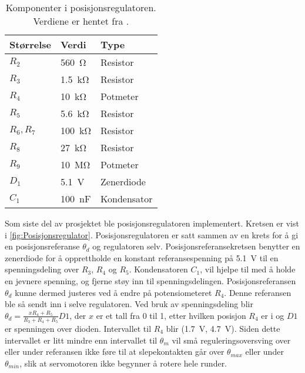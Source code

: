 \begin{table}[h]
    \centering
    \caption{Komponenter i posisjonsregulatoren. Verdiene er hentet fra \cite{AnalogMotorlabbOppgaver}.}
    \begin{tabular}{lll}
        \toprule
		Størrelse & Verdi & Type \\
		\midrule
        $R_2$ & \SI{560}{\ohm} & Resistor \\
        $R_3$ & \SI{1.5}{\kilo\ohm} & Resistor\\
        $R_4$ & \SI{10}{\kilo\ohm} & Potmeter\\
        $R_5$ & \SI{5.6}{\kilo\ohm} & Resistor\\
        $R_6, R_7$ & \SI{100}{\kilo\ohm} & Resistor\\
        $R_8$ & \SI{27}{\kilo\ohm} & Resistor\\
        $R_9$ & \SI{10}{\mega\ohm} & Potmeter\\
        $D_1$ & \SI{5.1}{\volt} & Zenerdiode\\
        $C_1$ & \SI{100}{\nano\farad} & Kondensator\\
		\bottomrule
    \end{tabular}
    \label{tab:my_label}
\end{table}

Som siste del av prosjektet ble posisjonsregulatoren implementert. Kretsen er vist i \autoref{fig:Posisjonsregulator}. Posisjonsregulatoren er satt sammen av en krets for å gi en posisjonsreferanse $\theta_d$ og regulatoren selv.
Posisjonsreferansekretsen benytter en zenerdiode for å opprettholde en konstant referansespenning på {\SI{5.1}{\volt}} til en spenningsdeling over $R_3$, $R_4$ og $R_5$. Kondensatoren $C_1$, vil hjelpe til med å holde en jevnere spenning, og fjerne støy inn til spenningsdelingen. Posisjonsreferansen $\theta_d$ kunne dermed justeres ved å endre på potensiometeret $R_4$. Denne referansen ble så sendt inn i selve regulatoren. Ved bruk av spenningsdeling blir $\theta_d = \frac{x R_4 + R_5}{R_3 + R_4 + R_5} D1$, der $x$ er et tall fra 0 til 1, etter hvilken posisjon $R_4$ er i og $D1$ er spenningen over dioden. Intervallet til $R_4$ blir (\SI{1.7}{\volt}, \SI{4.7}{\volt}). Siden dette intervallet er litt mindre enn intervallet til $\theta_m$ vil små reguleringsoversving over eller under referansen ikke føre til at slepekontakten går over $\theta_{max}$ eller under $\theta_{min}$, slik at servomotoren ikke begynner å rotere hele runder.

